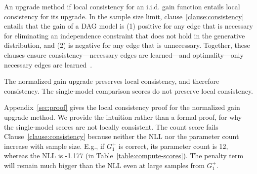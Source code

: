 \documentclass{article}
\begin{document}
An upgrade method  if local consistency for an i.i.d. gain function entails local consistency for its upgrade. In the sample size limit, clause~\ref{clause:consistency} entails that 
the gain of a DAG model is (1) positive for any edge that is necessary for eliminating an independence constraint that does not hold in the generative distribution, and (2) is negative for any edge that is unnecessary. Together, these clauses ensure consistency---necessary edges are learned---and optimality---only necessary edges are learned~\cite{Chickering2002}.
\begin{theorem} \label{th:consistency}
The normalized gain upgrade %
preserves local consistency, and therefore consistency. The single-model comparison scores do not preserve local consistency.
\end{theorem}
 
Appendix~\ref{sec:proof} gives the local consistency proof for the normalized gain upgrade method. We provide the intuition rather than a formal proof, for why the single-model scores are not locally consistent. The count score fails Clause~\ref{clause:consistency} because neither the NLL nor the parameter count increase with sample size.  E.g., if $G_{1}^{+}$ is correct, its parameter count is 12, whereas the NLL is -1.177 (in Table~\ref{table:compute-scores}). The penalty term will remain much bigger than the NLL even at large samples from $G_{1}^{+}$.
\end{document}
